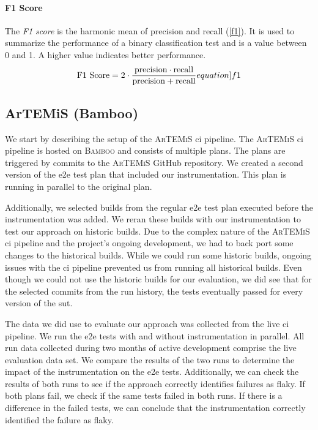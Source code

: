 \paragraph{F1 Score} The \emph{F1 score} is the harmonic mean of precision and recall (\ref{f1}).
It is used to summarize the performance of a binary classification test and is a value between 0 and 1.
A higher value indicates better performance.
\begin{equation}
	\text{F1 Score} = 2 \cdot \frac{\text{precision} \cdot \text{recall}}{\text{precision} + \text{recall}}
	\label[equation]{f1}
\end{equation}

\subsection{ArTEMiS (Bamboo)}
We start by describing the setup of the \textsc{ArTEMiS} \ac{ci} pipeline.
The \textsc{ArTEMiS} \ac{ci} pipeline is hosted on \textsc{Bamboo} \autocite{atlassian_bamboo_nodate} and consists of multiple plans.
The plans are triggered by commits to the \textsc{ArTEMiS} GitHub repository.
We created a second version of the \ac{e2e} test plan that included our instrumentation.
This plan is running in parallel to the original plan.

Additionally, we selected builds from the regular \ac{e2e} test plan executed before the instrumentation was added.
We reran these builds with our instrumentation to test our approach on historic builds.
Due to the complex nature of the \textsc{ArTEMiS} \ac{ci} pipeline and the project's ongoing development, we had to back port some changes to the historical builds.
While we could run some historic builds, ongoing issues with the \ac{ci} pipeline prevented us from running all historical builds.
Even though we could not use the historic builds for our evaluation, we did see that for the selected commits from the run history, the tests eventually passed for every version of the \ac{sut}.

The data we did use to evaluate our approach was collected from the live \ac{ci} pipeline.
We run the \ac{e2e} tests with and without instrumentation in parallel.
All run data collected during two months of active development comprise the live evaluation data set.
We compare the results of the two runs to determine the impact of the instrumentation on the \ac{e2e} tests.
Additionally, we can check the results of both runs to see if the approach correctly identifies failures as flaky.
If both plans fail, we check if the same tests failed in both runs.
If there is a difference in the failed tests, we can conclude that the instrumentation correctly identified the failure as flaky.

